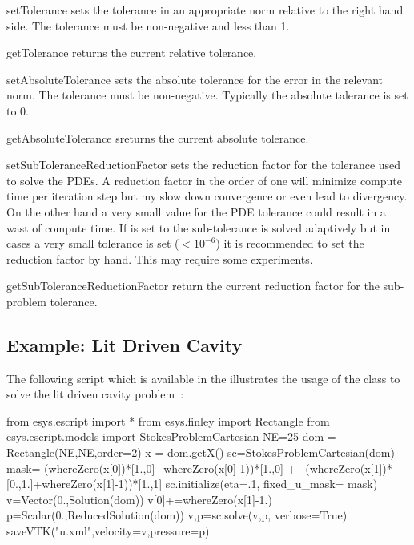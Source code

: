 \begin{methoddesc}[StokesProblemCartesian]{setTolerance}{}
sets the tolerance in an appropriate norm relative to the right hand side. The tolerance must be non-negative and less than 1.
\end{methoddesc}
\begin{methoddesc}[StokesProblemCartesian]{getTolerance}{}
returns the current relative tolerance.
\end{methoddesc}
\begin{methoddesc}[StokesProblemCartesian]{setAbsoluteTolerance}{}
sets the absolute tolerance for the error in the relevant norm. The tolerance must be non-negative. Typically the
absolute talerance is set to 0.
\end{methoddesc}
\begin{methoddesc}[StokesProblemCartesian]{getAbsoluteTolerance}{}
sreturns the current absolute tolerance.
\end{methoddesc}
\begin{methoddesc}[StokesProblemCartesian]{setSubToleranceReductionFactor}{}
sets the reduction factor for the tolerance used to solve the PDEs. A reduction factor 
in the order of one will minimize compute time per iteration step but my slow down convergence or even lead to 
divergency. On the other hand a very small value for the PDE tolerance could result in a wast of compute time.
If  is set to  the sub-tolerance is solved adaptively but
in cases a very small tolerance is set ($<10^{-6}$) it is recommended to set the
reduction factor by hand. This may require some experiments.
\end{methoddesc}
\begin{methoddesc}[StokesProblemCartesian]{getSubToleranceReductionFactor}{}
return the current reduction factor for the sub-problem tolerance.
\end{methoddesc}

\subsection{Example: Lit Driven Cavity}
 The following script  
 which is available in the \ExampleDirectory
illustrates the usage of the  class to solve
the lit driven cavity problem~\cite{LITDRIVENCAVITY}:
\begin{python}
from esys.escript import *
from esys.finley import Rectangle
from esys.escript.models import StokesProblemCartesian
NE=25
dom = Rectangle(NE,NE,order=2)
x = dom.getX()
sc=StokesProblemCartesian(dom)
mask= (whereZero(x[0])*[1.,0]+whereZero(x[0]-1))*[1.,0] + \
      (whereZero(x[1])*[0.,1.]+whereZero(x[1]-1))*[1.,1]
sc.initialize(eta=.1, fixed_u_mask= mask)
v=Vector(0.,Solution(dom))
v[0]+=whereZero(x[1]-1.)
p=Scalar(0.,ReducedSolution(dom))
v,p=sc.solve(v,p, verbose=True)
saveVTK("u.xml",velocity=v,pressure=p)
\end{python}

